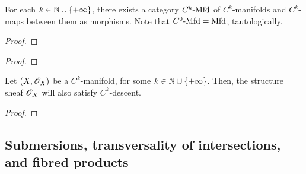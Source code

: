         \begin{proposition}
            For each $k \in \mathbb{N} \cup \{+\infty\}$, there exists a category $C^k\text{-}\mathrm{Mfd}$ of $C^k$-manifolds and $C^k$-maps between them as morphisms. Note that $C^0\text{-}\mathrm{Mfd} = \mathrm{Mfd}$, tautologically.
        \end{proposition}
            \begin{proof}
                
            \end{proof}

        \begin{proposition} \label{prop: C_k_topologies}
            
        \end{proposition}
            \begin{proof}
                
            \end{proof}
        \begin{lemma}[$C^k$-structures] \label{lemma: C_k_structures}
            Let $(X, \mathscr{O}_X)$ be a $C^k$-manifold, for some $k \in \mathbb{N} \cup \{+\infty\}$. Then, the structure sheaf $\mathscr{O}_X$ will also satisfy $C^k$-descent.
        \end{lemma}
            \begin{proof}
                
            \end{proof}
    

    \subsection{Submersions, transversality of intersections, and fibred products}